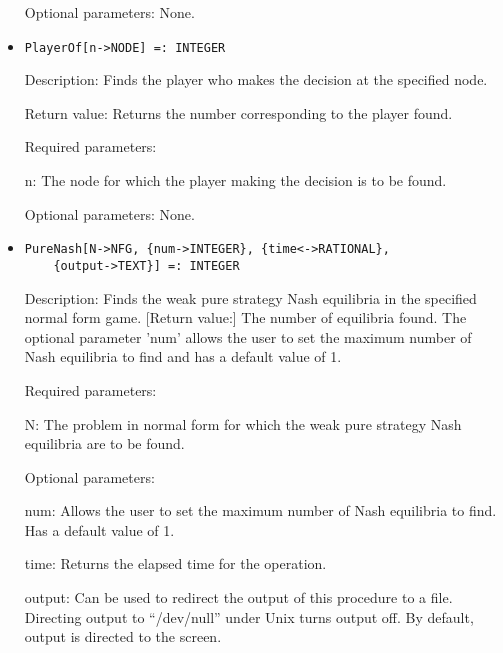 \begin{itemize}
\item
[Optional parameters:] None.
\ed

\item
\protect \large \begin{verbatim}
PlayerOf[n->NODE] =: INTEGER
\end{verbatim}\normalsize

\bd
\item
[Description:] Finds the player who makes the decision at the specified
node.
\item
[Return value:] Returns the number corresponding to the player found.
\item
[Required parameters:]\hfil\null

\bd
\item
[ n:] The node for which the player making the decision is to be
found.
\ed

\item
[Optional parameters:] None.
\ed

\item
\protect \large \begin{verbatim}
PureNash[N->NFG, {num->INTEGER}, {time<->RATIONAL}, 
	{output->TEXT}] =: INTEGER
\end{verbatim}\normalsize

\bd
\item
[Description:] Finds the weak pure strategy Nash equilibria in the 
specified normal form game.  
[Return value:] The number of equilibria found.  The optional parameter 
'num' allows the user to set the maximum number of Nash equilibria to 
find and has a default value of 1.
\item
[Required parameters:]\hfil\null
	
\bd
\item
[ N:] The problem in normal form for which the weak pure strategy
Nash equilibria are to be found.
\ed

\item
[Optional parameters:]\hfil\null
	
\bd
\item
[ num:] Allows the user to set the maximum number of Nash equilibria
to find.  Has a default value of 1.
\item
[ time:] Returns the elapsed time for the operation.
\item
[ output:] Can be used to redirect the output of this procedure to a
file.  Directing output to ``/dev/null'' under Unix turns 
output off.  By default, output is directed to the screen.  


\end{itemize}
